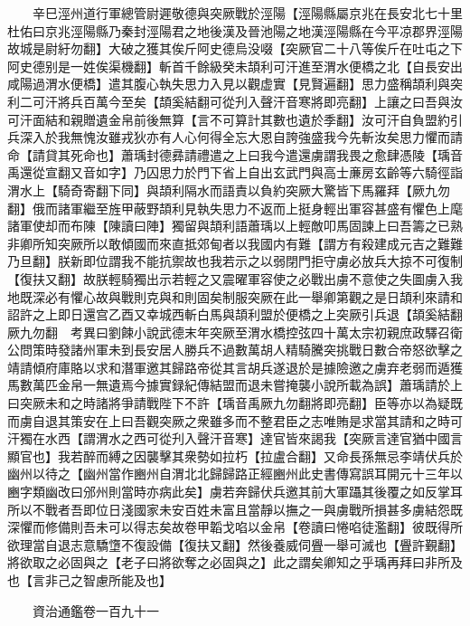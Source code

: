 　　辛巳涇州道行軍總管尉遲敬德與突厥戰於涇陽【涇陽縣屬京兆在長安北七十里杜佑曰京兆涇陽縣乃秦封涇陽君之地後漢及晉池陽之地漢涇陽縣在今平凉郡界涇陽故城是尉紆勿翻】大破之獲其俟斤阿史德烏没啜【突厥官二十八等俟斤在吐屯之下阿史德别是一姓俟渠機翻】斬首千餘級癸未頡利可汗進至渭水便橋之北【自長安出咸陽過渭水便橋】遣其腹心執失思力入見以觀虚實【見賢遍翻】思力盛稱頡利與突利二可汗將兵百萬今至矣【頡奚結翻可從刋入聲汗音寒將即亮翻】上讓之曰吾與汝可汗面結和親贈遺金帛前後無算【言不可算計其數也遺於季翻】汝可汗自負盟約引兵深入於我無愧汝雖戎狄亦有人心何得全忘大恩自誇強盛我今先斬汝矣思力懼而請命【請貸其死命也】蕭瑀封德彞請禮遣之上曰我今遣還虜謂我畏之愈肆憑陵【瑀音禹還從宣翻又音如字】乃囚思力於門下省上自出玄武門與高士亷房玄齡等六騎徑詣渭水上【騎奇寄翻下同】與頡利隔水而語責以負約突厥大驚皆下馬羅拜【厥九勿翻】俄而諸軍繼至旌甲蔽野頡利見執失思力不返而上挺身輕出軍容甚盛有懼色上麾諸軍使却而布陳【陳讀曰陣】獨留與頡利語蕭瑀以上輕敵叩馬固諫上曰吾籌之已熟非卿所知突厥所以敢傾國而來直抵郊甸者以我國内有難【謂方有殺建成元吉之難難乃旦翻】朕新即位謂我不能抗禦故也我若示之以弱閉門拒守虜必放兵大掠不可復制【復扶又翻】故朕輕騎獨出示若輕之又震曜軍容使之必戰出虜不意使之失圖虜入我地既深必有懼心故與戰則克與和則固矣制服突厥在此一舉卿第觀之是日頡利來請和詔許之上即日還宫乙酉又幸城西斬白馬與頡利盟於便橋之上突厥引兵退【頡奚結翻厥九勿翻　考異曰劉餗小說武德末年突厥至渭水橋控弦四十萬太宗初親庶政驛召衛公問策時發諸州軍未到長安居人勝兵不過數萬胡人精騎騰突挑戰日數合帝怒欲擊之靖請傾府庫賂以求和潛軍邀其歸路帝從其言胡兵遂退於是據險邀之虜弃老弱而遁獲馬數萬匹金帛一無遺焉今據實録紀傳結盟而退未嘗掩襲小說所載為誤】蕭瑀請於上曰突厥未和之時諸將爭請戰陛下不許【瑀音禹厥九勿翻將即亮翻】臣等亦以為疑既而虜自退其策安在上曰吾觀突厥之衆雖多而不整君臣之志唯賄是求當其請和之時可汗獨在水西【謂渭水之西可從刋入聲汗音寒】達官皆來謁我【突厥言達官猶中國言顯官也】我若醉而縛之因襲擊其衆勢如拉朽【拉盧合翻】又命長孫無忌李靖伏兵於幽州以待之【幽州當作豳州自渭北北歸歸路正經豳州此史書傳寫誤耳開元十三年以豳字類幽改曰邠州則當時亦病此矣】虜若奔歸伏兵邀其前大軍躡其後覆之如反掌耳所以不戰者吾即位日淺國家未安百姓未富且當靜以撫之一與虜戰所損甚多虜結怨既深懼而修備則吾未可以得志矣故卷甲韜戈啗以金帛【卷讀曰惓啗徒濫翻】彼既得所欲理當自退志意驕墯不復設備【復扶又翻】然後養威伺舋一舉可滅也【舋許覲翻】將欲取之必固與之【老子曰將欲奪之必固與之】此之謂矣卿知之乎瑀再拜曰非所及也【言非己之智慮所能及也】

　　資治通鑑卷一百九十一


    


 


